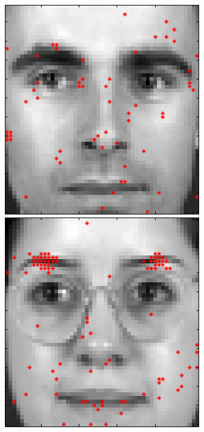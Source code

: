 \documentclass[a4paper,10pt]{article}
\begin{document}
\begin{figure}[ht]
 \includegraphics[width=\textwidth*11/100]{figures/XM2VTS_Full_5.png}
 \includegraphics[width=\textwidth*11/100]{figures/XM2VTS_Full_6.png}

\end{figure}
\end{document}
